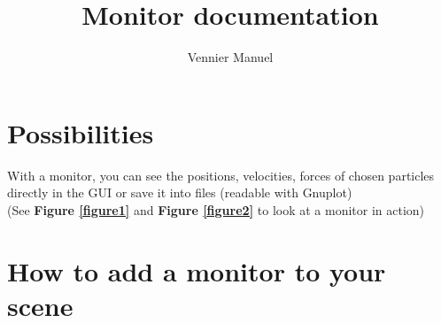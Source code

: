 \documentclass[a4paper,10pt]{article}
\title{Monitor documentation}
\author{\small {Vennier Manuel}}
\begin{document}
\lstset{language=C++}
\maketitle

\section{Possibilities}

With a monitor, you can see the positions, velocities, forces of chosen particles directly in the GUI or save it into files (readable with Gnuplot)\\
(See \textbf{Figure \ref{figure1} } and \textbf{Figure \ref{figure2} } to look at a monitor in action)

\section{How to add a monitor to your scene}
\end{document}
